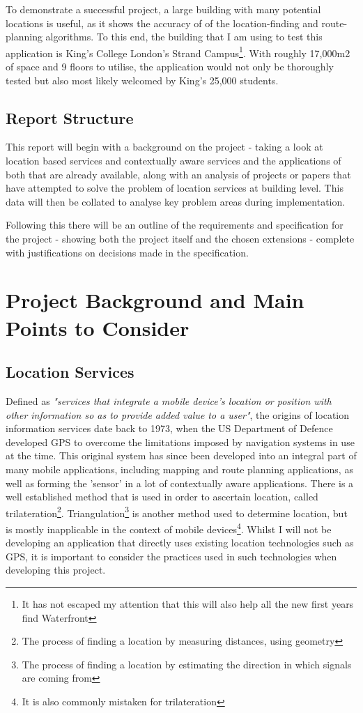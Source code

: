 \documentclass[11pt]{informatics-report}
\begin{document}
To demonstrate a successful project, a large building with many potential locations is useful, as it shows the accuracy of of the location-finding and route-planning algorithms. To this end, the building that I am using to test this application is King's College London's Strand Campus\footnote{ It has not escaped my attention that this will also help all the new first years find Waterfront}. With roughly 17,000m2 of space and 9 floors to utilise, the application would not only be thoroughly tested but also most likely welcomed by King's 25,000 students\cite{headcount}.

\section{Report Structure}

This report will begin with a background on the project - taking a look at location based services and contextually aware services and the applications of both that are already available, along with an analysis of projects or papers that have attempted to solve the problem of location services at building level. This data will then be collated to analyse key problem areas during implementation. 

Following this there will be an outline of the requirements and specification for the project - showing both the project itself and the chosen extensions - complete with justifications on decisions made in the specification.


\chapter{Project Background and Main Points to Consider}

\section{Location Services}

Defined as \textit{"services that integrate a mobile device's location or position with other information so as to provide added value to a user"}\cite{schiller2004location}, the origins of location information services date back to 1973, when the US Department of Defence developed GPS to overcome the limitations imposed by navigation systems in use at the time\cite{national1995global}. This original system has since been developed into an integral part of many mobile applications, including mapping and route planning applications, as well as forming the 'sensor' in a lot of contextually aware applications. There is a well established method that is used in order to ascertain location, called trilateration\footnote{The process of finding a location by measuring distances, using geometry}. Triangulation\footnote{The process of finding a location by estimating the direction in which signals are coming from} is another method used to determine location, but is mostly inapplicable in the context of mobile devices\footnote{It is also commonly mistaken for trilateration}. Whilst I will not be developing an application that directly uses existing location technologies such as GPS, it is important to consider the practices used in such technologies when developing this project.
\end{document}
